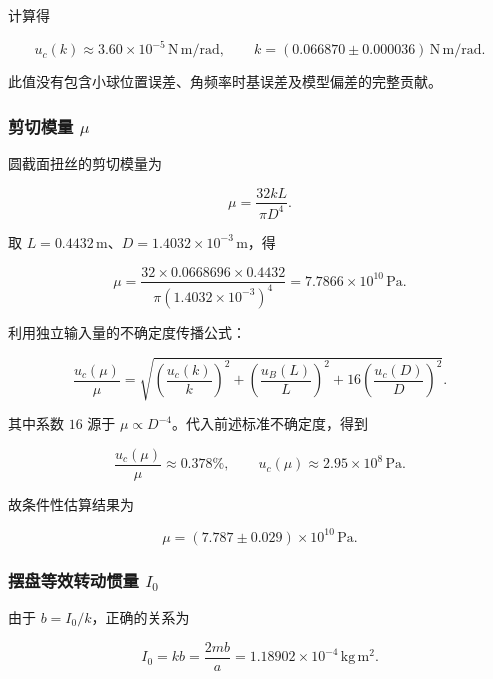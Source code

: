 \documentclass[UTF8]{ctexart}
\begin{document}
计算得

\begin{equation}
 u_c(k)\approx3.60\times10^{-5}\,\mathrm{N\,m/rad},
 \qquad k=(0.066870\pm0.000036)\,\mathrm{N\,m/rad}.
\end{equation}

此值没有包含小球位置误差、角频率时基误差及模型偏差的完整贡献。

\subsubsection{剪切模量 $\mu$}

圆截面扭丝的剪切模量为

\begin{equation}
 \mu=\frac{32kL}{\pi D^4}.
\end{equation}

取 $L=0.4432\,\mathrm m$、$D=1.4032\times10^{-3}\,\mathrm m$，得

\begin{equation}
 \mu=\frac{32\times0.0668696\times0.4432}
 {\pi(1.4032\times10^{-3})^4}
 =7.7866\times10^{10}\,\mathrm{Pa}.
\end{equation}

利用独立输入量的不确定度传播公式：

\begin{equation}
 \frac{u_c(\mu)}\mu=
 \sqrt{\left(\frac{u_c(k)}k\right)^2+
       \left(\frac{u_B(L)}L\right)^2+
       16\left(\frac{u_c(D)}D\right)^2}.
\end{equation}

其中系数 $16$ 源于 $\mu\propto D^{-4}$。代入前述标准不确定度，得到

\begin{equation}
 \frac{u_c(\mu)}\mu\approx0.378\%,\qquad
 u_c(\mu)\approx2.95\times10^8\,\mathrm{Pa}.
\end{equation}

故条件性估算结果为

\begin{equation}
 \boxed{\mu=(7.787\pm0.029)\times10^{10}\,\mathrm{Pa}}.
\end{equation}

\subsubsection{摆盘等效转动惯量 $I_0$}

由于 $b=I_0/k$，正确的关系为

\begin{equation}
 I_0=kb=\frac{2mb}{a}
 =1.18902\times10^{-4}\,\mathrm{kg\,m^2}.
\end{equation}
\end{document}
